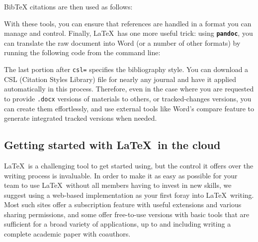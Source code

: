 
\noindent BibTeX citations are then used as follows:


With these tools, you can ensure that references are handled
in a format you can manage and control.\cite{flom2005latex}
Finally, \LaTeX\ has one more useful trick:
using \textbf{\texttt{pandoc}},
you can translate the raw document into Word
(or a number of other formats)
by running the following code from the command line:


\noindent The last portion after \texttt{csl=} specifies the bibliography style.
You can download a CSL (Citation Styles Library) file
for nearly any journal and have it applied automatically in this process.
Therefore, even in the case where you are requested to provide
\texttt{.docx} versions of materials to others, or tracked-changes versions,
you can create them effortlessly,
and use external tools like Word's compare feature
to generate integrated tracked versions when needed.

\subsection{Getting started with \LaTeX\ in the cloud}

\LaTeX\ is a challenging tool to get started using,
but the control it offers over the writing process is invaluable.
In order to make it as easy as possible for your team
to use \LaTeX\ without all members having to invest in new skills,
we suggest using a web-based implementation as your first foray into \LaTeX\ writing.
Most such sites offer a subscription feature with useful extensions and various sharing permissions,
and some offer free-to-use versions with basic tools that are sufficient
for a broad variety of applications,
up to and including writing a complete academic paper with coauthors.

